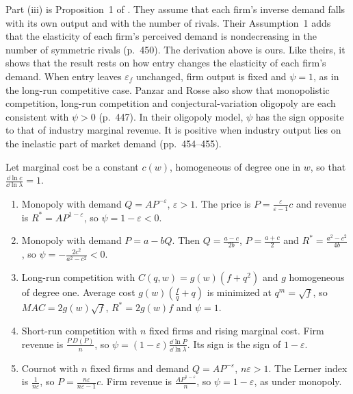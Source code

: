Part (iii) is Proposition~1 of \citet[p.~451]{PanzarRosse1987}. They assume that each firm's inverse demand
falls with its own output and with the number of rivals. Their Assumption~1 adds that the elasticity of each
firm's perceived demand is nondecreasing in the number of symmetric rivals (p.~450). The derivation above is
ours. Like theirs, it shows that the result rests on how entry changes the elasticity of each firm's demand.
When entry leaves $\varepsilon_f$ unchanged, firm output is fixed and $\psi = 1$, as in the long-run
competitive case. Panzar and Rosse also show that monopolistic competition, long-run competition and
conjectural-variation oligopoly are each consistent with $\psi > 0$ (p.~447). In their oligopoly model, $\psi$
has the sign opposite to that of industry marginal revenue. It is positive when industry output lies on the
inelastic part of market demand (pp.~454--455).

\begin{example}\label{ex:03-pr-examples}
Let marginal cost be a constant $c(w)$, homogeneous of degree one in $w$, so that $\frac{\dd\ln c}{\dd\ln\lambda}
= 1$.
\begin{enumerate}[label=(\alph*)]
  \item Monopoly with demand $Q = AP^{-\varepsilon}$, $\varepsilon > 1$. The price is $P =
  \frac{\varepsilon}{\varepsilon - 1}c$ and revenue is $R^* = AP^{1 - \varepsilon}$, so $\psi = 1 -
  \varepsilon < 0$.
  \item Monopoly with demand $P = a - bQ$. Then $Q = \frac{a - c}{2b}$, $P = \frac{a + c}{2}$ and $R^* =
  \frac{a^2 - c^2}{4b}$, so $\psi = -\frac{2c^2}{a^2 - c^2} < 0$.
  \item Long-run competition with $C(q, w) = g(w)(f + q^2)$ and $g$ homogeneous of degree one. Average cost
  $g(w)(\frac{f}{q} + q)$ is minimized at $q^m = \sqrt{f}$, so $MAC = 2g(w)\sqrt{f}$, $R^* = 2g(w)f$ and
  $\psi = 1$.
  \item Short-run competition with $n$ fixed firms and rising marginal cost. Firm revenue is $\frac{P\,
  D(P)}{n}$, so $\psi = (1 - \varepsilon)\frac{\dd\ln P}{\dd\ln\lambda}$. Its sign is the sign of $1 -
  \varepsilon$.
  \item Cournot with $n$ fixed firms and demand $Q = AP^{-\varepsilon}$, $n\varepsilon > 1$. The Lerner
  index is $\frac{1}{n\varepsilon}$, so $P = \frac{n\varepsilon}{n\varepsilon - 1}c$. Firm revenue is
  $\frac{AP^{1 - \varepsilon}}{n}$, so $\psi = 1 - \varepsilon$, as under monopoly.
\end{enumerate}
\end{example}

